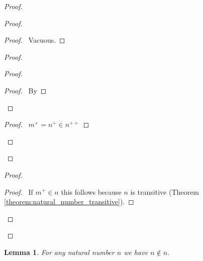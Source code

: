 \documentclass{article}
\let\qed\relax
\newtheorem{lemma}[axiom]{Lemma}
\theoremstyle{definition}
\begin{document}
    \begin{proof}
        \pf
        \begin{proof}
            \begin{proof}
                \pf\ Vacuous.
            \end{proof}
            \begin{proof}
                \begin{proof}
                    \begin{proof}
                        \pf\ By 
                    \end{proof}
                \end{proof}
                \begin{proof}
                    \pf\ $m^+ = n^+ \in n^{++}$
                \end{proof}
            \end{proof}
        \end{proof}
        \begin{proof}
            \begin{proof}
                \pf\ If $m^+ \in n$ this follows because $n$ is transitive (Theorem \ref{theorem:natural_number_transitive}).
            \end{proof}
        \end{proof}
        \qed
    \end{proof}

    \begin{lemma}
        \label{lemma:natural_number_irreflexive}
        For any natural number $n$ we have $n \notin n$.
    \end{lemma}
\end{document}
